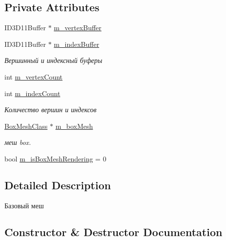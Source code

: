 \subsection*{Private Attributes}
\begin{DoxyCompactItemize}
\item 
I\+D3\+D11\+Buffer $\ast$ \hyperlink{class_mesh_class_a1e3f5f36653333151ef6a0b7a4db1cfe}{m\+\_\+vertex\+Buffer}
\item 
I\+D3\+D11\+Buffer $\ast$ \hyperlink{class_mesh_class_ae4fd98071bdb2b885db47a217939ca95}{m\+\_\+index\+Buffer}
\begin{DoxyCompactList}\small\item\em Вершинный и индексный буферы \end{DoxyCompactList}\item 
int \hyperlink{class_mesh_class_aae7894f0edb7f03f4b8bbc7ac6166bb1}{m\+\_\+vertex\+Count}
\item 
int \hyperlink{class_mesh_class_ad0cd85b7880bff244c22b7b04c3990c4}{m\+\_\+index\+Count}
\begin{DoxyCompactList}\small\item\em Количество вершин и индексов \end{DoxyCompactList}\item 
\hyperlink{class_box_mesh_class}{Box\+Mesh\+Class} $\ast$ \hyperlink{class_mesh_class_a8f38b73423d64141f220e4c2b1c2dcba}{m\+\_\+box\+Mesh}
\begin{DoxyCompactList}\small\item\em меш box. \end{DoxyCompactList}\item 
bool \hyperlink{class_mesh_class_a8b7bb6f5707c8b941e6afaaca8b91472}{m\+\_\+is\+Box\+Mesh\+Rendering} = 0
\end{DoxyCompactItemize}


\subsection{Detailed Description}
Базовый меш 

\subsection{Constructor \& Destructor Documentation}
\mbox{\label{class_mesh_class_ad4b527f72e1bb03475c0e2787feb02e3}} 

